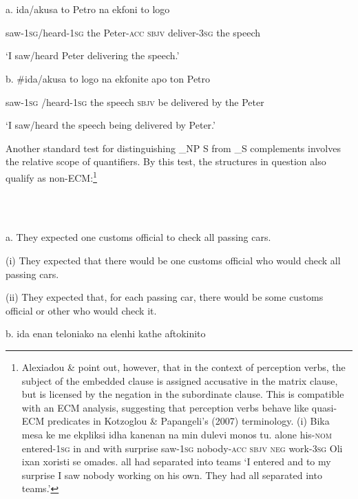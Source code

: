 \documentclass[output=paper]{langsci/langscibook}
\begin{document}
\ea%
    \label{ex:key:37}
    \gll\\
        \\
    \glt
    \z

          a.  ida/akusa                to   Petro        na    ekfoni        to   logo

    saw{}-\textsc{1sg}/heard{}-\textsc{1sg}  the  Peter{}-\textsc{acc}  \textsc{sbjv} deliver-\textsc{3sg} the  speech

    ‘I saw/heard Peter delivering the speech.’

  b.  \#ida/akusa              to  logo     na     ekfonite       apo  ton Petro

    saw{}-\textsc{1sg} /heard{}-\textsc{1sg}  the speech \textsc{sbjv} be delivered by   the Peter

    ‘I saw/heard the speech being delivered by Peter.’

Another standard test for distinguishing \_NP S from \_S complements involves the relative scope of quantifiers. By this test, the structures in question also qualify as non-ECM:\footnote{Alexiadou \& \citet{Anagnostopoulou2016} point out, however, that in the context of perception verbs, the subject of the embedded clause is assigned accusative in the matrix clause, but is licensed by the negation in the subordinate clause. This is compatible with an ECM analysis, suggesting that perception verbs behave like quasi-ECM predicates in Kotzoglou \& Papangeli’s (2007) terminology. (i)  Bika         mesa    ke me     ekpliksi idha       kanenan         na min dulevi monos tu.  alone his-\textsc{nom}  entered{}-\textsc{1sg} in   and with   surprise saw{}-\textsc{1sg} nobody{}-\textsc{acc  sbjv  neg} work{}-\textsc{3sg}   Oli ixan xoristi      se omades.  all had separated into teams  ‘I entered and to my surprise I saw nobody working on his own. They had all separated into teams.’}

\ea%
    \label{ex:key:38}
    \gll\\
        \\
    \glt
    \z

          a.  They expected one customs official to check all passing cars.

    (i)  They expected that there would be one customs official who would         check all passing cars.

    (ii)  They expected that, for each passing car, there would be some           customs official or other who would check it.  

  b.  ida          enan teloniako            na       elenhi   kathe  aftokinito
\end{document}
